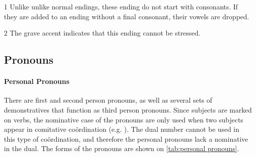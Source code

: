 \begin{table}[h]
\centering
\caption{Noun Endings}
\label{tab:noun endings}
\begin{threeparttable}
\begin{tablenotes}
\item[1] Unlike unlike normal endings, these ending do not start with
    consonants. If they are added to an ending without a final consonant, their
    vowels are dropped.
\item[2] The grave accent indicates that this ending cannot be stressed.
\end{tablenotes}
\end{threeparttable}
\end{table}

\subsection{Pronouns}
\paragraph{Personal Pronouns} There are first and second person pronouns, as
well as several sets of demonstratives that function as third person pronouns.
Since subjects are marked on verbs, the nominative case of the pronouns are
only used when two subjects appear in comitative coördination (e.g. ). The dual number cannot be used in this type of coördination,
and therefore the personal pronouns lack a nominative in the dual. The forms of
the pronouns are shown on \cref{tab:personal pronouns}.

